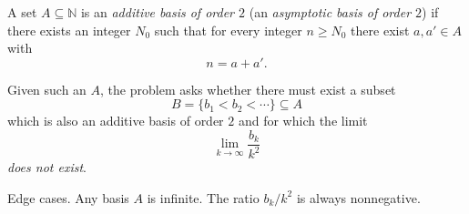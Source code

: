 A set $A\subseteq\mathbb N$ is an \emph{additive basis of order $2$} (an \emph{asymptotic basis of order $2$}) if there exists an integer $N_0$ such that for every integer $n\ge N_0$ there exist $a,a'\in A$ with
\[
n=a+a'.
\]

Given such an $A$, the problem asks whether there must exist a subset
\[
B=\{b_1<b_2<\cdots\}\subseteq A
\]
which is also an additive basis of order $2$ and for which the limit
\[
\lim_{k\to\infty}\frac{b_k}{k^2}
\]
\emph{does not exist}.

Edge cases.
Any basis $A$ is infinite. The ratio $b_k/k^2$ is always nonnegative.
